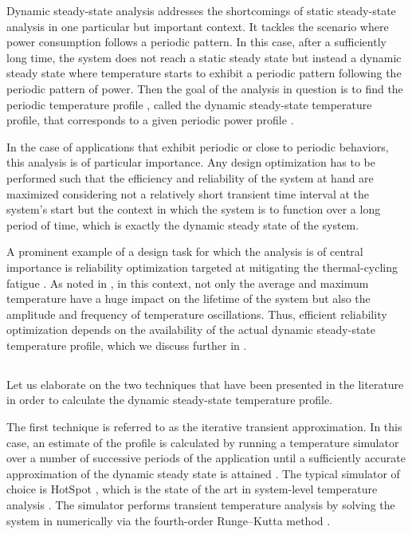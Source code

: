 Dynamic steady-state analysis addresses the shortcomings of static steady-state
analysis in one particular but important context. It tackles the scenario where
power consumption follows a periodic pattern. In this case, after a sufficiently
long time, the system does not reach a static steady state but instead a dynamic
steady state where temperature starts to exhibit a periodic pattern following
the periodic pattern of power. Then the goal of the analysis in question is to
find the periodic temperature profile \mq, called the dynamic steady-state
temperature profile, that corresponds to a given periodic power profile \mp.

In the case of applications that exhibit periodic or close to periodic
behaviors, this analysis is of particular importance. Any design optimization
has to be performed such that the efficiency and reliability of the system at
hand are maximized considering not a relatively short transient time interval at
the system's start but the context in which the system is to function over a
long period of time, which is exactly the dynamic steady state of the system.

A prominent example of a design task for which the analysis is of central
importance is reliability optimization targeted at mitigating the
thermal-cycling fatigue \cite{jedec2016}. As noted in
, in this context, not only the average and
maximum temperature have a huge impact on the lifetime of the system but also
the amplitude and frequency of temperature oscillations. Thus, efficient
reliability optimization depends on the availability of the actual dynamic
steady-state temperature profile, which we discuss further in
.

\subsection{\priortitle}

Let us elaborate on the two techniques that have been presented in the
literature in order to calculate the dynamic steady-state temperature profile.

The first technique is referred to as the iterative transient approximation. In
this case, an estimate of the profile is calculated by running a temperature
simulator over a number of successive periods of the application until a
sufficiently accurate approximation of the dynamic steady state is attained
\cite{srinivasan2004}. The typical simulator of choice is HotSpot
\cite{skadron2003}, which is the state of the art in system-level temperature
analysis \cite{srinivasan2004, liao2005, coskun2006, liu2007, huang2009b,
xiang2010, thiele2011}. The simulator performs transient temperature analysis by
solving the system in  numerically via the
fourth-order Runge--Kutta method \cite{press2007}.

